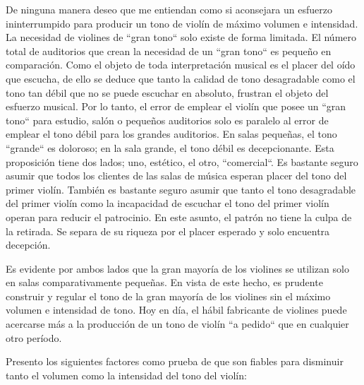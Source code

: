 \documentclass[12pt]{book}
\begin{document}
De ninguna manera deseo que me entiendan como si aconsejara un esfuerzo ininterrumpido para producir un tono de violín de máximo volumen e intensidad. La necesidad de violines de ``gran tono`` solo existe de forma limitada. El número total de auditorios que crean la necesidad de un ``gran tono`` es pequeño en comparación. Como el objeto de toda interpretación musical es el placer del oído que escucha, de ello se deduce que tanto la calidad de tono desagradable como el tono tan débil que no se puede escuchar en absoluto, frustran el objeto del esfuerzo musical. Por lo tanto, el error de emplear el violín que posee un ``gran tono`` para estudio, salón o pequeños auditorios solo es paralelo al error de emplear el tono débil para los grandes auditorios. En salas pequeñas, el tono ``grande`` es doloroso; en la sala grande, el tono débil es decepcionante. Esta proposición tiene dos lados; uno, estético, el otro, ``comercial``. Es bastante seguro asumir que todos los clientes de las salas de música esperan placer del tono del primer violín. También es bastante seguro asumir que tanto el tono desagradable del primer violín como la incapacidad de escuchar el tono del primer violín operan para reducir el patrocinio. En este asunto, el patrón no tiene la culpa de la retirada. Se separa de su riqueza por el placer esperado y solo encuentra decepción.

Es evidente por ambos lados que la gran mayoría de los violines se utilizan solo en salas comparativamente pequeñas. En vista de este hecho, es prudente construir y regular el tono de la gran mayoría de los violines sin el máximo volumen e intensidad de tono. Hoy en día, el hábil fabricante de violines puede acercarse más a la producción de un tono de violín ``a pedido`` que en cualquier otro período.

Presento los siguientes factores como prueba de que son fiables para disminuir tanto el volumen como la intensidad del tono del violín:
\end{document}
